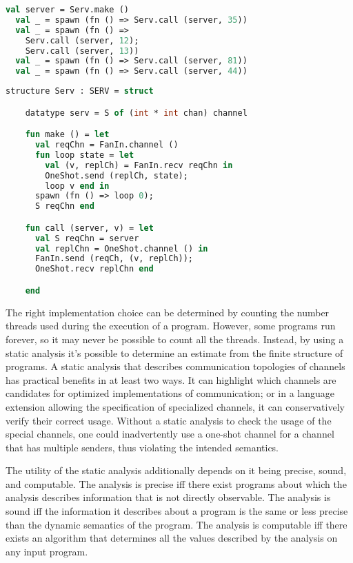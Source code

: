 \documentclass{article}
\begin{document}
\begin{lstlisting}[language=ML, escapechar=\%]
  val server = Serv.make ()
  val _ = spawn (fn () => Serv.call (server, 35))
  val _ = spawn (fn () => 
    Serv.call (server, 12); 
    Serv.call (server, 13))
  val _ = spawn (fn () => Serv.call (server, 81))
  val _ = spawn (fn () => Serv.call (server, 44))
  \end{lstlisting}

\begin{lstlisting}[language=ML, escapechar=\%]
  structure Serv : SERV = struct 

    datatype serv = S of (int * int chan) channel 

    fun make () = let 
      val reqChn = FanIn.channel ()
      fun loop state = let
        val (v, replCh) = FanIn.recv reqChn in 
        OneShot.send (replCh, state);
        loop v end in
      spawn (fn () => loop 0);
      S reqChn end 

    fun call (server, v) = let 
      val S reqChn = server
      val replChn = OneShot.channel () in 
      FanIn.send (reqCh, (v, replCh));
      OneShot.recv replChn end

    end
  \end{lstlisting}

The right implementation choice can be determined by counting the number threads used during
the execution of a program. However, some programs run forever, so it may never be possible to
count all the threads. Instead, by using a static analysis it's possible to determine an
estimate from the finite structure of programs. A static analysis that describes communication
topologies of channels has practical benefits in at least two ways.  It can highlight which
channels are candidates for optimized implementations of communication; or in a language
extension allowing the specification of specialized channels, it can conservatively verify
their correct usage. Without a static analysis to check the usage of the special channels, one
could inadvertently use a one-shot channel for a channel that has multiple senders, thus
violating the intended semantics. 

The utility of the static analysis additionally depends on it being precise, sound, and
computable. The analysis is precise iff there exist programs about which the analysis
describes information that is not directly observable. The analysis is sound iff the
information it describes about a program is the same or less precise than the dynamic
semantics of the program. The analysis is computable iff there exists an algorithm that
determines all the values described by the analysis on any input program.
\end{document}

